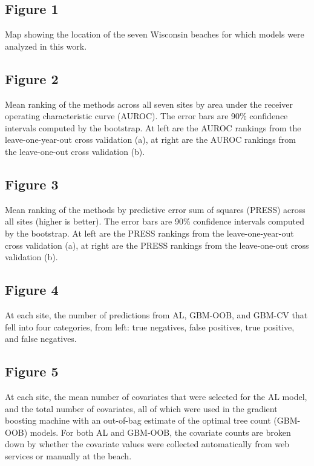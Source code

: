 \documentclass[authoryear,review, 12pt]{elsarticle}
\begin{document}
\subsection{Figure 1}
Map showing the location of the seven Wisconsin beaches for which models were analyzed in this work.

\subsection{Figure 2}
Mean ranking of the methods across all seven sites by area
under the receiver operating characteristic curve (AUROC). The error bars are
90\% confidence intervals computed by the bootstrap. At left are the
AUROC rankings from the leave-one-year-out cross validation (a), at
right are the AUROC rankings from the leave-one-out cross validation
(b).

\subsection{Figure 3}
Mean ranking of the methods by predictive error sum of squares
(PRESS) across all sites (higher is better). The error bars are 90\%
confidence intervals computed by the bootstrap. At left are the PRESS
rankings from the leave-one-year-out cross validation (a), at right are
the PRESS rankings from the leave-one-out cross validation (b).

\subsection{Figure 4}
At each site, the number of predictions from AL, GBM-OOB, and
GBM-CV that fell into four categories, from left: true negatives, false
positives, true positive, and false negatives.

\subsection{Figure 5}
At each site, the mean number of covariates that were selected
for the AL model, and the total number of covariates, all of which were
used in the gradient boosting machine with an out-of-bag estimate of the
optimal tree count (GBM-OOB) models. For both AL and GBM-OOB, the
covariate counts are broken down by whether the covariate values were
collected automatically from web services or manually at the beach.
\end{document}
